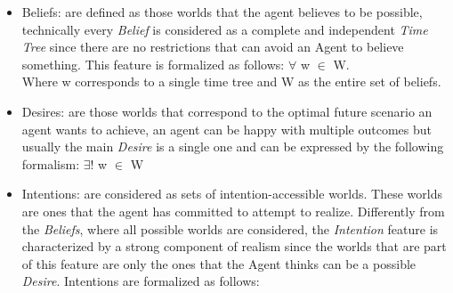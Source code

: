 \documentclass[a4paper]{article}
\begin{document}
\begin{itemize}

\item Beliefs: are defined as those worlds that the agent believes to be possible, technically every \textit{Belief} is considered as a complete and independent \textit{Time Tree} since there are no restrictions that can avoid an Agent to believe something. This feature is formalized as follows: $\forall$ w $\in$ W. \\
Where w corresponds to a single time tree and W as the entire set of beliefs. 
\item Desires: are those worlds that correspond to the optimal future scenario an agent wants to achieve, an agent can be happy with multiple outcomes but usually the main \textit{Desire} is a single one and can be expressed by the following formalism: $\exists!$ w $\in$ W 
\item Intentions: are considered as sets of intention-accessible worlds. These worlds are ones that the agent has committed to attempt to realize. Differently from the \textit{Beliefs}, where all possible worlds are considered, the \textit{Intention} feature is characterized by a strong component of realism since the worlds that are part of this feature are only the ones that the Agent thinks can be a possible \textit{Desire}. Intentions are formalized as follows:

\end{itemize} 
\end{document}
